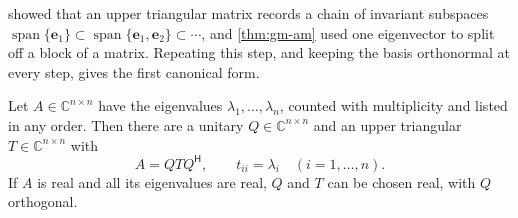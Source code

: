  showed that an upper triangular matrix records a chain of invariant subspaces $\operatorname{span}\{\mathbf e_1\}\subset\operatorname{span}\{\mathbf e_1,\mathbf e_2\}\subset\cdots$, and \cref{thm:gm-am} used one eigenvector to split off a block of a matrix. Repeating this step, and keeping the basis orthonormal at every step, gives the first canonical form.

\begin{theorem}
\label{thm:schur}
Let $A\in\mathbb C^{n\times n}$ have the eigenvalues $\lambda_1,\ldots,\lambda_n$, counted with multiplicity and listed in any order. Then there are a unitary $Q\in\mathbb C^{n\times n}$ and an upper triangular $T\in\mathbb C^{n\times n}$ with
\[
A=QTQ^{\mathsf H},\qquad t_{ii}=\lambda_i\quad(i=1,\ldots,n).
\]
If $A$ is real and all its eigenvalues are real, $Q$ and $T$ can be chosen real, with $Q$ orthogonal.
\end{theorem}

